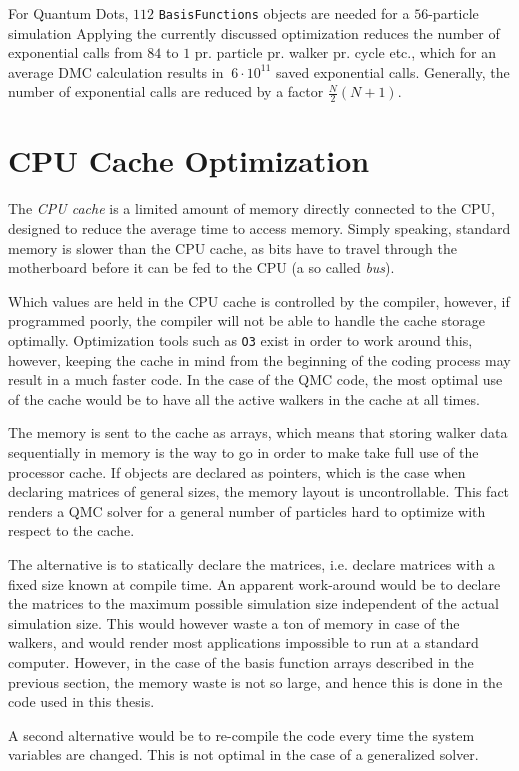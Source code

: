 For Quantum Dots, $112$ \verb+BasisFunctions+ objects are needed for a $56$-particle simulation Applying the currently discussed optimization reduces the number of exponential calls from $84$ to $1$ pr. particle pr. walker pr. cycle etc., which for an average DMC calculation results in $~6\cdot 10^11$ saved exponential calls. Generally, the number of exponential calls are reduced by a factor $\frac{N}{2}(N + 1)$.


\section{CPU Cache Optimization}
\label{sec:CPUcache}

The \textit{CPU cache} is a limited amount of memory directly connected to the CPU, designed to reduce the average time to access memory. Simply speaking, standard memory is slower than the CPU cache, as bits have to travel through the motherboard before it can be fed to the CPU (a so called \textit{bus}). 

Which values are held in the CPU cache is controlled by the compiler, however, if programmed poorly, the compiler will not be able to handle the cache storage optimally. Optimization tools such as \verb+O3+ exist in order to work around this, however, keeping the cache in mind from the beginning of the coding process may result in a much faster code. In the case of the QMC code, the most optimal use of the cache would be to have all the active walkers in the cache at all times. 

The memory is sent to the cache as arrays, which means that storing walker data sequentially in memory is the way to go in order to make take full use of the processor cache. If objects are declared as pointers, which is the case when declaring matrices of general sizes, the memory layout is uncontrollable. This fact renders a QMC solver for a general number of particles hard to optimize with respect to the cache.

The alternative is to statically declare the matrices, i.e. declare matrices with a fixed size known at compile time. An apparent work-around would be to declare the matrices to the maximum possible simulation size independent of the actual simulation size. This would however waste a ton of memory in case of the walkers, and would render most applications impossible to run at a standard computer. However, in the case of the basis function arrays described in the previous section, the memory waste is not so large, and hence this is done in the code used in this thesis.

A second alternative would be to re-compile the code every time the system variables are changed. This is not optimal in the case of a generalized solver.








